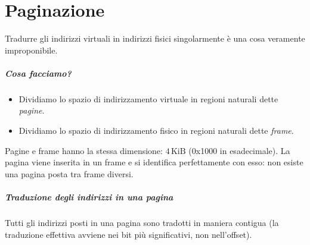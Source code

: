 
\chapter{Paginazione}
Tradurre gli indirizzi virtuali in indirizzi fisici singolarmente è una cosa veramente improponibile. 
\paragraph{Cosa facciamo?}
\begin{itemize}
	\item Dividiamo lo spazio di indirizzamento virtuale in regioni naturali dette \emph{pagine}.
	\item Dividiamo lo spazio di indirizzamento fisico in regioni naturali dette \emph{frame}.
\end{itemize}
Pagine e frame hanno la stessa dimensione: $4\,\text{KiB}$ (0x1000 in esadecimale). La pagina viene inserita in un frame e si identifica perfettamente con esso: non esiste una pagina posta tra frame diversi.
\paragraph{Traduzione degli indirizzi in una pagina} Tutti gli indirizzi posti in una pagina sono tradotti in maniera contigua (la traduzione effettiva avviene nei bit più significativi, non nell'offset).
